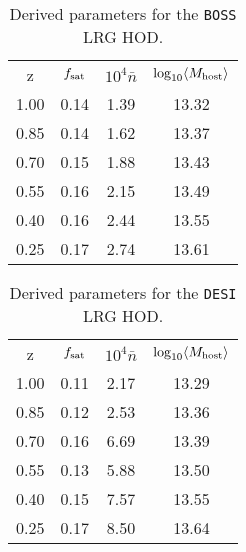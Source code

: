 \documentclass[fleqn,usenatbib]{mnras}
\begin{document}
\begin{table}
\centering
\begin{tabular}{c  c c c} 
 \hline \hline

 z & $f_{\rm sat}$ & $10^4\bar{n}$ & $ \log_{10}\langle M_{\rm host} \rangle$\\
1.00 &0.14  &  1.39  &  13.32    \\
0.85 &0.14  &  1.62   & 13.37    \\
0.70 &0.15  &  1.88    &13.43    \\
0.55 &0.16  &  2.15   & 13.49    \\
0.40 &0.16  &  2.44   & 13.55  \\  
0.25 &0.17 &   2.74   & 13.61\\    
 \hline \hline
\end{tabular}
\caption{Derived parameters for the \texttt{BOSS} LRG HOD.}
\label{table:boss}
\end{table}
\begin{table}
\centering
\begin{tabular}{c c c c} 
 \hline \hline 
 z & $f_{\rm sat}$ & $10^4\bar{n}$ & $ \log_{10}\langle M_{\rm host} \rangle$\\ 
1.00 &0.11  &  2.17 &   13.29    \\
0.85 &0.12  &  2.53  &  13.36    \\
0.70 &0.16  &  6.69  &  13.39    \\
0.55 &0.13  &  5.88  &  13.50   \\ 
0.40 &0.15 &   7.57  &  13.55 \\   
0.25 &0.17&   8.50 &  13.64\\   
\hline \hline
\end{tabular}
\caption{Derived parameters for the \texttt{DESI} LRG HOD.}
\label{table:desi}
\end{table}
\end{document}
